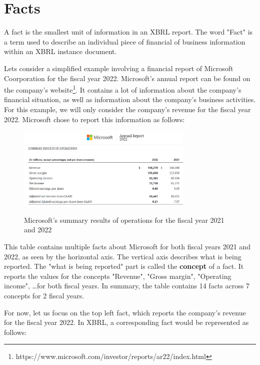 \section{Facts}
\label{sec:facts}

A fact is the smallest unit of information in an XBRL report. 
The word "Fact" is a term used to describe an individual piece of financial of business information within an XBRL instance document. 

Lets consider a simplified example involving a financial report of Microsoft Coorporation for the fiscal year 2022.
Microsoft's annual report can be found on the company's website\footnote[0]{https://www.microsoft.com/investor/reports/ar22/index.html}.
It contains a lot of information about the company's financial situation, as well as information about the company's business activities.
For this example, we will only consider the company's revenue for the fiscal year 2022.
Microsoft chose to report this information as follows:

\begin{figure}[H]
    \centering
    \includegraphics[width=0.75\textwidth]{images/microsoft_annual_report_2022.png}
    \caption{Microsoft's summary results of operations for the fiscal year 2021 and 2022}
    \label{fig:microsoft_annual_report_2022}
    \cite{microsoft2022ar}
\end{figure}

This table contains multiple facts about Microsoft for both fiscal years 2021 and 2022, as seen by the horizontal axis.
The vertical axis describes what is being reported. The "what is being reported" part is called the \textbf{concept} of a fact.
It reports the values for the concepts "Revenue", "Gross margin", "Operating income", \dots for both fiscal years.
In summary, the table contains 14 facts across 7 concepts for 2 fiscal years.

For now, let us focus on the top left fact, which reports the company's revenue for the fiscal year 2022.
In XBRL, a corresponding fact would be represented as follows:

